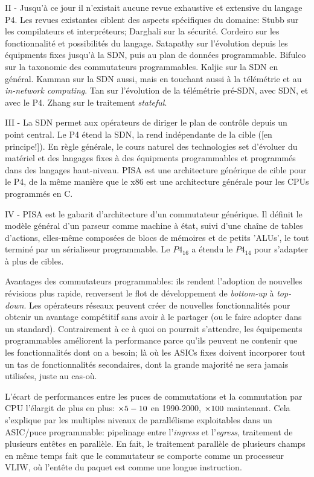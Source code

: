 II - Jusqu'à ce jour il n'existait aucune revue exhaustive et extensive du langage P4. Les revues existantes ciblent des aspects spécifiques du domaine: Stubb sur les compilateurs et interpréteurs; Darghali sur la sécurité. Cordeiro sur les fonctionnalité et possibilités du langage. Satapathy sur l'évolution depuis les équipments fixes jusqu'à la SDN, puis au plan de données programmable. Bifulco sur la taxonomie des commutateurs programmables. Kaljic sur la SDN en général. Kamman sur la SDN aussi, mais en touchant aussi à la télémétrie et au \emph{in-network computing}. Tan sur l'évolution de la télémétrie pré-SDN, avec SDN, et avec le P4. Zhang sur le traitement \emph{stateful}.

III - La SDN permet aux opérateurs de diriger le plan de contrôle depuis un point central. Le P4 étend la SDN, la rend indépendante de la cible ([en principe!]). En règle générale, le cours naturel des technologies set d'évoluer du matériel et des langages fixes à des équipments programmables et programmés dans des langages haut-niveau. PISA est une architecture générique de cible pour le P4, de la même manière que le x86 est une architecture générale pour les CPUs programmés en C.

IV - PISA est le gabarit d'architecture d'un commutateur générique. Il définit le modèle général d'un parseur comme machine à état, suivi d'une chaîne de tables d'actions, elles-même composées de blocs de mémoires et de petits 'ALUs', le tout terminé par un sérialiseur programmable. Le $P4_{16}$ a étendu le $P4_{14}$ pour s'adapter à plus de cibles.

Avantages des commutateurs programmables: ils rendent l'adoption de nouvelles révisions plus rapide, renversent le flot de développement de \emph{bottom-up} à \emph{top-down}. Les opérateurs réseaux peuvent créer de nouvelles fonctionnalités pour obtenir un avantage compétitif sans avoir à le partager (ou le faire adopter dans un standard). Contrairement à ce à quoi on pourrait s'attendre, les équipements programmables améliorent la performance parce qu'ils peuvent ne contenir que les fonctionnalités dont on a besoin; là où les ASICs fixes doivent incorporer tout un tas de fonctionnalités secondaires, dont la grande majorité ne sera jamais utilisées, juste au cas-où.

L'écart de performances entre les puces de commutations et la commutation par CPU l'élargit de plus en plus: $\times5-10$ en 1990-2000, $\times 100$ maintenant. Cela s'explique par les multiples niveaux de parallélisme exploitables dans un ASIC/puce programmable: pipelinage entre l'\emph{ingress} et l'\emph{egress}, traitement de plusieurs entêtes en parallèle. En fait, le traitement parallèle de plusieurs champs en même temps fait que le commutateur se comporte comme un processeur VLIW, où l'entête du paquet est comme une longue instruction.

